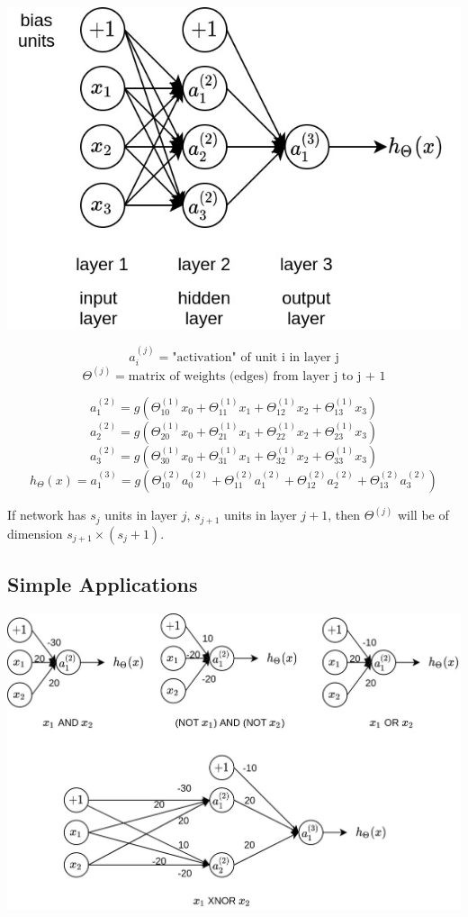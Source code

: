 \documentclass{article}
\begin{document}
\begin{center}
\includegraphics[scale=0.4]{./images/neural_network.jpg}
\end{center}
\[a_i^{(j)} = \text{"activation" of unit i in layer j}\]
\[\Theta^{(j)} = \text{matrix of weights (edges) from layer j to j + 1}\]

\bigskip

\[a_1^{(2)} = g(\Theta_{10}^{(1)} x_0 + \Theta_{11}^{(1)} x_1 + \Theta_{12}^{(1)} x_2 + \Theta_{13}^{(1)} x_3)\]
\[a_2^{(2)} = g(\Theta_{20}^{(1)} x_0 + \Theta_{21}^{(1)} x_1 + \Theta_{22}^{(1)} x_2 + \Theta_{23}^{(1)} x_3)\]
\[a_3^{(2)} = g(\Theta_{30}^{(1)} x_0 + \Theta_{31}^{(1)} x_1 + \Theta_{32}^{(1)} x_2 + \Theta_{33}^{(1)} x_3)\]
\[h_{\Theta}(x) = a_1^{(3)} = g(\Theta_{10}^{(2)} a_0^{(2)} + \Theta_{11}^{(2)} a_1^{(2)} + \Theta_{12}^{(2)} a_2^{(2)} + \Theta_{13}^{(2)} a_3^{(2)})\]

\bigskip

\noindent If network has \(s_j\) units in layer \(j\), \(s_{j + 1}\) units in layer \(j + 1\), then \(\Theta^{(j)}\) will be of dimension \(s_{j + 1} \times (s_j + 1)\).

\subsection{Simple Applications}

\begin{center}
\includegraphics[scale=0.3]{./images/neural_network_simple_applications.jpg}
\end{center}
\end{document}

